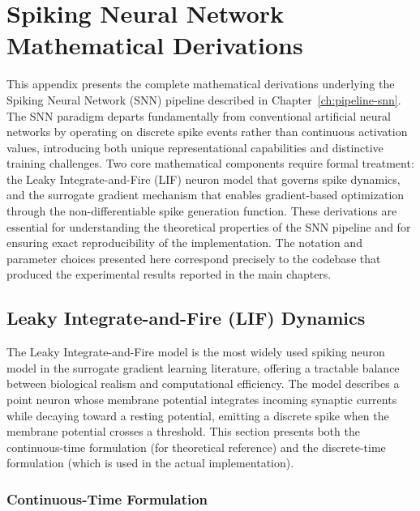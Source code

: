 \chapter{Spiking Neural Network Mathematical Derivations}
\label{app:snn-math}

This appendix presents the complete mathematical derivations underlying the Spiking Neural Network (SNN) pipeline described in Chapter~\ref{ch:pipeline-snn}. The SNN paradigm departs fundamentally from conventional artificial neural networks by operating on discrete spike events rather than continuous activation values, introducing both unique representational capabilities and distinctive training challenges. Two core mathematical components require formal treatment: the Leaky Integrate-and-Fire (LIF) neuron model that governs spike dynamics, and the surrogate gradient mechanism that enables gradient-based optimization through the non-differentiable spike generation function. These derivations are essential for understanding the theoretical properties of the SNN pipeline and for ensuring exact reproducibility of the implementation. The notation and parameter choices presented here correspond precisely to the codebase that produced the experimental results reported in the main chapters.

\section{Leaky Integrate-and-Fire (LIF) Dynamics}
\label{app:lif-dynamics}

The Leaky Integrate-and-Fire model is the most widely used spiking neuron model in the surrogate gradient learning literature, offering a tractable balance between biological realism and computational efficiency. The model describes a point neuron whose membrane potential integrates incoming synaptic currents while decaying toward a resting potential, emitting a discrete spike when the membrane potential crosses a threshold. This section presents both the continuous-time formulation (for theoretical reference) and the discrete-time formulation (which is used in the actual implementation).

\subsection{Continuous-Time Formulation}


